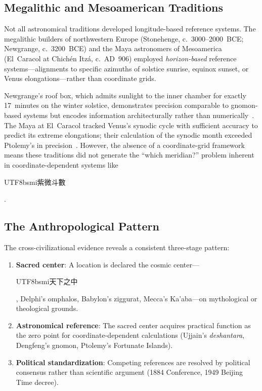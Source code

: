 \documentclass[10pt,a4paper]{article}
\newcommand{\zh}[1]{\begin{CJK}{UTF8}{bsmi}#1\end{CJK}}
\begin{document}
\subsection{Megalithic and Mesoamerican Traditions}
\label{subsec:megalithic}

Not all astronomical traditions developed longitude-based reference systems.
The megalithic builders of northwestern Europe (Stonehenge, c.~3000--2000~BCE;
Newgrange, c.~3200~BCE) and the Maya astronomers of Mesoamerica (El~Caracol
at Chich\'{e}n Itz\'{a}, c.~AD~906) employed \emph{horizon-based} reference
systems---alignments to specific azimuths of solstice sunrise, equinox sunset,
or Venus elongations---rather than coordinate grids.

Newgrange's roof box, which admits sunlight to the inner chamber for exactly
17~minutes on the winter solstice, demonstrates precision comparable to
gnomon-based systems but encodes information architecturally rather than
numerically~\cite{patrick1974}. The Maya at El~Caracol tracked Venus's
synodic cycle with sufficient accuracy to predict its extreme elongations;
their calculation of the synodic month exceeded Ptolemy's in
precision~\cite{aveni2001}. However, the absence of a coordinate-grid
framework means these traditions did not generate the ``which meridian?''
problem inherent in coordinate-dependent systems like \zh{紫微斗數}.

\subsection{The Anthropological Pattern}
\label{subsec:pattern}

The cross-civilizational evidence reveals a consistent three-stage pattern:

\begin{enumerate}
  \item \textbf{Sacred center}: A location is declared the cosmic
    center---\zh{天下之中}, Delphi's omphalos, Babylon's ziggurat,
    Mecca's Ka'aba---on mythological or theological grounds.
  \item \textbf{Astronomical reference}: The sacred center acquires
    practical function as the zero point for coordinate-dependent
    calculations (Ujjain's \textit{deshantara}, Dengfeng's gnomon,
    Ptolemy's Fortunate Islands).
  \item \textbf{Political standardization}: Competing references are
    resolved by political consensus rather than scientific argument
    (1884 Conference, 1949 Beijing Time decree).
\end{enumerate}
\end{document}
